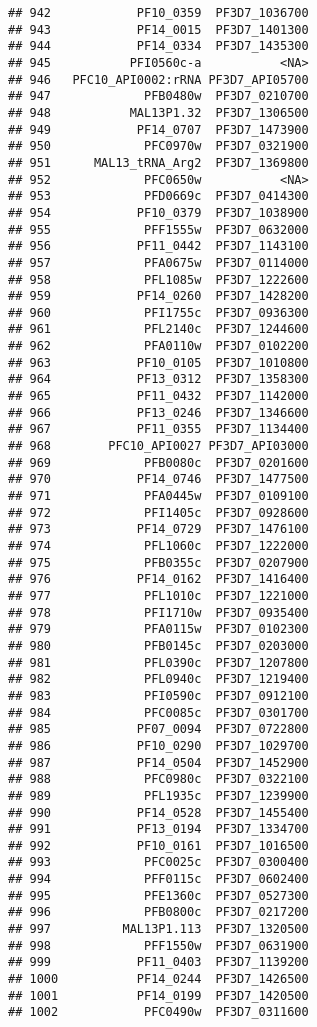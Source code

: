 \documentclass{article}\usepackage[]{graphicx}\usepackage[]{color}
\makeatletter
\newenvironment{kframe}{%
 \def\at@end@of@kframe{}%
 \ifinner\ifhmode%
  \def\at@end@of@kframe{\end{minipage}}%
  \begin{minipage}{\columnwidth}%
 \fi\fi%
 \def\FrameCommand##1{\hskip\@totalleftmargin \hskip-\fboxsep
 \colorbox{shadecolor}{##1}\hskip-\fboxsep
     \hskip-\linewidth \hskip-\@totalleftmargin \hskip\columnwidth}%
 \MakeFramed {\advance\hsize-\width
   \@totalleftmargin\z@ \linewidth\hsize
   \@setminipage}}%
 {\par\unskip\endMakeFramed%
 \at@end@of@kframe}
\newenvironment{knitrout}{}{} %
\makeatother
\begin{document}
\begin{knitrout}
\begin{kframe}
\begin{verbatim}
## 942            PF10_0359  PF3D7_1036700
## 943            PF14_0015  PF3D7_1401300
## 944            PF14_0334  PF3D7_1435300
## 945           PFI0560c-a           <NA>
## 946   PFC10_API0002:rRNA PF3D7_API05700
## 947             PFB0480w  PF3D7_0210700
## 948           MAL13P1.32  PF3D7_1306500
## 949            PF14_0707  PF3D7_1473900
## 950             PFC0970w  PF3D7_0321900
## 951      MAL13_tRNA_Arg2  PF3D7_1369800
## 952             PFC0650w           <NA>
## 953             PFD0669c  PF3D7_0414300
## 954            PF10_0379  PF3D7_1038900
## 955             PFF1555w  PF3D7_0632000
## 956            PF11_0442  PF3D7_1143100
## 957             PFA0675w  PF3D7_0114000
## 958             PFL1085w  PF3D7_1222600
## 959            PF14_0260  PF3D7_1428200
## 960             PFI1755c  PF3D7_0936300
## 961             PFL2140c  PF3D7_1244600
## 962             PFA0110w  PF3D7_0102200
## 963            PF10_0105  PF3D7_1010800
## 964            PF13_0312  PF3D7_1358300
## 965            PF11_0432  PF3D7_1142000
## 966            PF13_0246  PF3D7_1346600
## 967            PF11_0355  PF3D7_1134400
## 968        PFC10_API0027 PF3D7_API03000
## 969             PFB0080c  PF3D7_0201600
## 970            PF14_0746  PF3D7_1477500
## 971             PFA0445w  PF3D7_0109100
## 972             PFI1405c  PF3D7_0928600
## 973            PF14_0729  PF3D7_1476100
## 974             PFL1060c  PF3D7_1222000
## 975             PFB0355c  PF3D7_0207900
## 976            PF14_0162  PF3D7_1416400
## 977             PFL1010c  PF3D7_1221000
## 978             PFI1710w  PF3D7_0935400
## 979             PFA0115w  PF3D7_0102300
## 980             PFB0145c  PF3D7_0203000
## 981             PFL0390c  PF3D7_1207800
## 982             PFL0940c  PF3D7_1219400
## 983             PFI0590c  PF3D7_0912100
## 984             PFC0085c  PF3D7_0301700
## 985            PF07_0094  PF3D7_0722800
## 986            PF10_0290  PF3D7_1029700
## 987            PF14_0504  PF3D7_1452900
## 988             PFC0980c  PF3D7_0322100
## 989             PFL1935c  PF3D7_1239900
## 990            PF14_0528  PF3D7_1455400
## 991            PF13_0194  PF3D7_1334700
## 992            PF10_0161  PF3D7_1016500
## 993             PFC0025c  PF3D7_0300400
## 994             PFF0115c  PF3D7_0602400
## 995             PFE1360c  PF3D7_0527300
## 996             PFB0800c  PF3D7_0217200
## 997          MAL13P1.113  PF3D7_1320500
## 998             PFF1550w  PF3D7_0631900
## 999            PF11_0403  PF3D7_1139200
## 1000           PF14_0244  PF3D7_1426500
## 1001           PF14_0199  PF3D7_1420500
## 1002            PFC0490w  PF3D7_0311600

\end{verbatim}
\end{kframe}
\end{knitrout}
\end{document}
